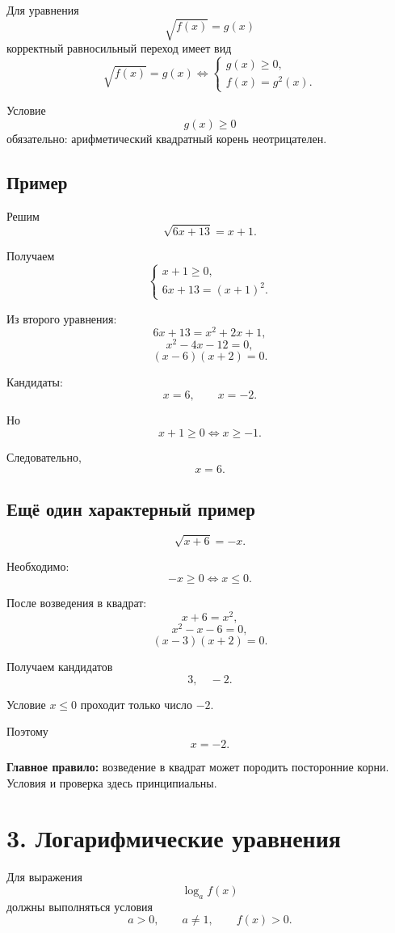 \documentclass[a4paper,12pt]{article}
\newcommand{\key}[1]{\textcolor{darkaccent}{\textbf{#1}}}
\begin{document}
Для уравнения
\[
\sqrt{f(x)}=g(x)
\]
корректный равносильный переход имеет вид
\[
\boxed{
\sqrt{f(x)}=g(x)
\iff
\begin{cases}
g(x)\ge0,\\
f(x)=g^2(x).
\end{cases}}
\]

Условие
\[
g(x)\ge0
\]
обязательно: арифметический квадратный корень неотрицателен.

\subsection*{Пример}

Решим
\[
\sqrt{6x+13}=x+1.
\]

Получаем
\[
\begin{cases}
x+1\ge0,\\
6x+13=(x+1)^2.
\end{cases}
\]

Из второго уравнения:
\[
6x+13=x^2+2x+1,
\]
\[
x^2-4x-12=0,
\]
\[
(x-6)(x+2)=0.
\]

Кандидаты:
\[
x=6,\qquad x=-2.
\]

Но
\[
x+1\ge0
\iff
x\ge-1.
\]

Следовательно,
\[
\boxed{x=6}.
\]

\subsection*{Ещё один характерный пример}

\[
\sqrt{x+6}=-x.
\]

Необходимо:
\[
-x\ge0
\iff
x\le0.
\]

После возведения в квадрат:
\[
x+6=x^2,
\]
\[
x^2-x-6=0,
\]
\[
(x-3)(x+2)=0.
\]

Получаем кандидатов
\[
3,\quad -2.
\]

Условие \(x\le0\) проходит только число \(-2\).

Поэтому
\[
\boxed{x=-2}.
\]

\key{Главное правило:} возведение в квадрат может породить посторонние корни. Условия и проверка здесь принципиальны.


\section*{\textcolor{darkaccent}{3. Логарифмические уравнения}}

Для выражения
\[
\log_a f(x)
\]
должны выполняться условия
\[
\boxed{
a>0,\qquad
a\ne1,\qquad
f(x)>0.}
\]
\end{document}
